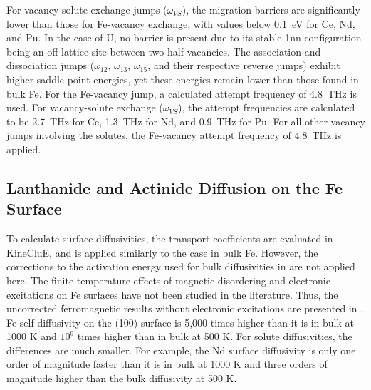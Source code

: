 \documentclass[preprint,12pt]{elsarticle}
\begin{document}
For vacancy-solute exchange jumps (\( \omega_{VS} \)), the migration barriers are significantly lower than those for Fe-vacancy exchange, with values below 0.1~eV for Ce, Nd, and Pu. In the case of U, no barrier is present due to its stable 1nn configuration being an off-lattice site between two half-vacancies. The association and dissociation jumps (\( \omega_{12} \), \( \omega_{13} \), \( \omega_{15} \), and their respective reverse jumps) exhibit higher saddle point energies, yet these energies remain lower than those found in bulk Fe.  
For the Fe-vacancy jump, a calculated attempt frequency of 4.8~THz is used. For vacancy-solute exchange (\( \omega_{VS} \)), the attempt frequencies are calculated to be 2.7~THz for Ce, 1.3~THz for Nd, and 0.9~THz for Pu. For all other vacancy jumps involving the solutes, the Fe-vacancy attempt frequency of 4.8~THz is applied.

\FloatBarrier

\subsection{Lanthanide and Actinide Diffusion on the Fe Surface}

\noindent To calculate surface diffusivities, the transport coefficients are evaluated in KineCluE, and  is applied similarly to the case in bulk Fe. However, the corrections to the activation energy used for bulk diffusivities in  are not applied here.
The finite-temperature effects of magnetic disordering and electronic excitations on Fe surfaces have not been studied in the literature. Thus, the uncorrected ferromagnetic results without electronic excitations are presented in . Fe self-diffusivity on the (100) surface is 5,000 times higher than it is in bulk at 1000 K and $10^9$ times higher than in bulk at 500 K. For solute diffusivities, the differences are much smaller. For example, the Nd surface diffusivity is only one order of magnitude faster than it is in bulk at 1000 K and three orders of magnitude higher than the bulk diffusivity at 500 K.
\end{document}
